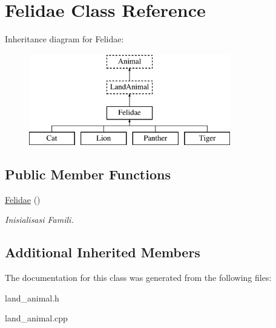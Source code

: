 \hypertarget{class_felidae}{}\section{Felidae Class Reference}
\label{class_felidae}
Inheritance diagram for Felidae\+:\begin{figure}[H]
\begin{center}
\leavevmode
\includegraphics[height=4.000000cm]{class_felidae}
\end{center}
\end{figure}
\subsection*{Public Member Functions}
\begin{DoxyCompactItemize}
\item 
\hyperlink{class_felidae_ac9522febbd6cee144fac2d7281f6e7f6}{Felidae} ()\hypertarget{class_felidae_ac9522febbd6cee144fac2d7281f6e7f6}{}\label{class_felidae_ac9522febbd6cee144fac2d7281f6e7f6}

\begin{DoxyCompactList}\small\item\em Inisialisasi Famili. \end{DoxyCompactList}\end{DoxyCompactItemize}
\subsection*{Additional Inherited Members}


The documentation for this class was generated from the following files\+:\begin{DoxyCompactItemize}
\item 
land\+\_\+animal.\+h\item 
land\+\_\+animal.\+cpp\end{DoxyCompactItemize}
